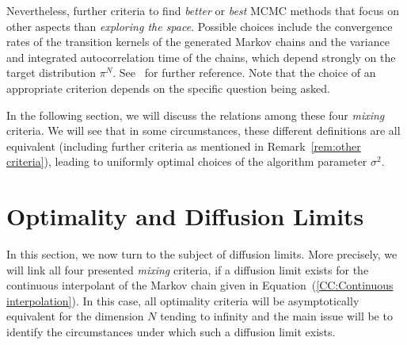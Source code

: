 \begin{rem}\label{rem:other criteria}
Nevertheless, further criteria to find \textit{better} or \textit{best} MCMC methods that focus on other aspects than \textit{exploring the space}. Possible choices include the convergence rates of the transition kernels of the generated Markov chains and the variance and integrated autocorrelation time of the chains, which depend strongly on the target distribution $ \pi^{N} $. See~\autocite{Rosenthal2008} for further reference. Note that the choice of an appropriate criterion depends on the specific question being asked. 
\end{rem}

In the following section, we will discuss the relations among these four \textit{mixing} criteria. We will see that in some circumstances, these different definitions are all equivalent (including further criteria as mentioned in Remark~\ref{rem:other criteria}), leading to uniformly optimal choices of the algorithm parameter $\sigma^2$.


\section{Optimality and Diffusion Limits}
\label{CC:Optimality and Diffusion Limits}

In this section, we now turn to the subject of diffusion limits. More precisely, we will link all four presented \textit{mixing} criteria, if a diffusion limit exists for the continuous interpolant of the Markov chain given in Equation~(\ref{CC:Continuous interpolation}). In this case, all optimality criteria will be asymptotically equivalent for the dimension $N$ tending to infinity and the main issue will be to identify the circumstances under which such a diffusion limit exists.

